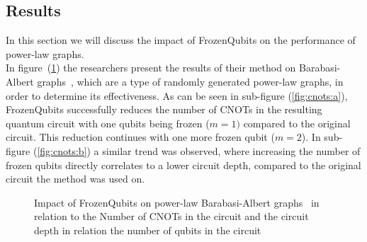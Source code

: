 \subsection{Results}\label{results}
In this section we will discuss the impact of FrozenQubits on the performance of power-law graphs.\\
In figure~(\ref{fig:cnots}) the researchers present the results of their method on Barabasi-Albert graphs~\cite{barabasi}, which are a type of randomly generated power-law graphs, in order to determine its effectiveness. As can be seen in sub-figure (\ref{fig:cnots:a}), FrozenQubits successfully reduces the number of CNOTs in the resulting quantum circuit with one qubits being frozen ($m=1)$ compared to the original circuit. This reduction continues with one more frozen qubit ($m=2$). In sub-figure (\ref{fig:cnots:b}) a similar trend was observed, where increasing the number of frozen qubits directly correlates to a lower circuit depth, compared to the original circuit the method was used on.
\begin{figure}[H]
    \centering 
    \hfill
    \caption{\label{fig:cnots}Impact of FrozenQubits on power-law Barabasi-Albert graphs~\cite{barabasi} in relation to the Number of CNOTs in the circuit and the circuit depth in relation the number of qubits in the circuit}
\end{figure}
